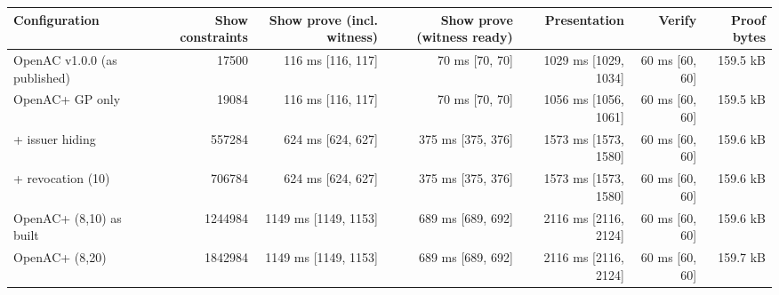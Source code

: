 \begin{tabular}{lrrrrrr}
\toprule
Configuration & Show constraints & Show prove (incl. witness) & Show prove (witness ready) & Presentation & Verify & Proof bytes \\
\midrule
OpenAC v1.0.0 (as published) & 17500 & 116 ms [116, 117] & 70 ms [70, 70] & 1029 ms [1029, 1034] & 60 ms [60, 60] & 159.5 kB \\
OpenAC+ GP only & 19084 & 116 ms [116, 117] & 70 ms [70, 70] & 1056 ms [1056, 1061] & 60 ms [60, 60] & 159.5 kB \\
+ issuer hiding & 557284 & 624 ms [624, 627] & 375 ms [375, 376] & 1573 ms [1573, 1580] & 60 ms [60, 60] & 159.6 kB \\
+ revocation (10) & 706784 & 624 ms [624, 627] & 375 ms [375, 376] & 1573 ms [1573, 1580] & 60 ms [60, 60] & 159.6 kB \\
OpenAC+ (8,10) as built & 1244984 & 1149 ms [1149, 1153] & 689 ms [689, 692] & 2116 ms [2116, 2124] & 60 ms [60, 60] & 159.6 kB \\
OpenAC+ (8,20) & 1842984 & 1149 ms [1149, 1153] & 689 ms [689, 692] & 2116 ms [2116, 2124] & 60 ms [60, 60] & 159.7 kB \\
\bottomrule
\end{tabular}
